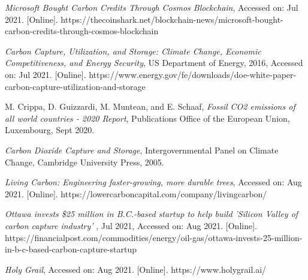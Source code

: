 \documentclass{article}
\begin{document}
\begin{thebibliography}{1}
 \textit{Microsoft Bought Carbon Credits Through Cosmos Blockchain}, Accessed on: Jul 2021. [Online]. https://thecoinshark.net/blockchain-news/microsoft-bought-carbon-credits-through-cosmos-blockchain

 \textit{Carbon Capture, Utilization, and Storage: Climate Change, Economic Competitiveness, and Energy Security}, US Department of Energy, 2016, Accessed on: Jul 2021. [Online]. https://www.energy.gov/fe/downloads/doe-white-paper-carbon-capture-utilization-and-storage

 M. Crippa, D. Guizzardi, M. Muntean, and E. Schaaf, \textit{Fossil CO2 emissions of all world countries - 2020 Report}, Publications Office of the European Union, Luxembourg, Sept 2020.

 \textit{Carbon Dioxide Capture and Storage}, Intergovernmental Panel on Climate Change, Cambridge University Press, 2005.

 \textit{Living Carbon: Engineering faster-growing, more durable trees}, Accessed on: Aug 2021. [Online]. https://lowercarboncapital.com/company/livingcarbon/


 \textit{Ottawa invests \$25 million in B.C.-based startup to help build 'Silicon Valley of carbon capture industry' }, Jul 2021, Accessed on: Aug 2021. [Online]. https://financialpost.com/commodities/energy/oil-gas/ottawa-invests-25-million-in-b-c-based-carbon-capture-startup

 \textit{Holy Grail}, Accessed on: Aug 2021. [Online]. https://www.holygrail.ai/

\end{thebibliography}
\end{document}
